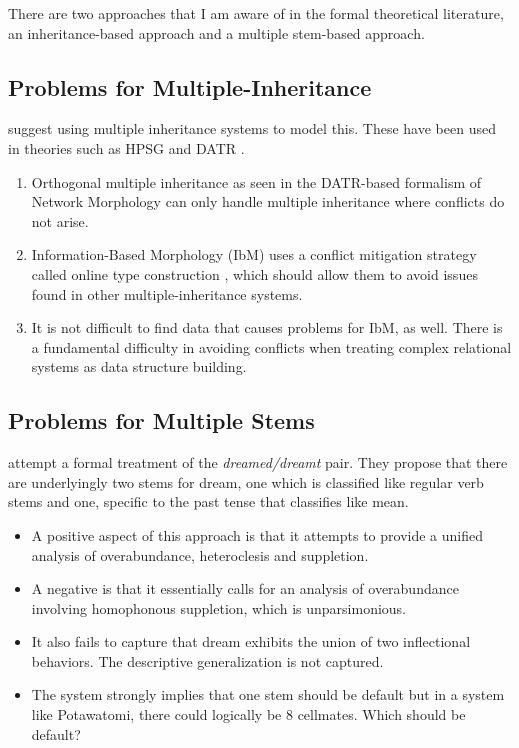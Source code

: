 There are two approaches that I am aware of in the formal theoretical
literature, an inheritance-based approach and a multiple stem-based
approach.

\subsection{Problems for Multiple-Inheritance}

\citep{naranjo2016overabundance} suggest using multiple
inheritance systems to model this. These have been used in theories
such as HPSG \citep{flickinger1985structure, flickinger1987lexical,
  sag1987information} and DATR \citep{evans1996datr}.

\begin{enumerate}
\item Orthogonal multiple inheritance as seen in the DATR-based
  formalism of Network Morphology \citep{brown2012network} can only
  handle multiple inheritance where conflicts do not arise.
\item Information-Based Morphology (IbM)
  \citep{crysmann2012establishing, crysmann2016variable} uses a
  conflict mitigation strategy called online type construction
  \citep{koenig1994type}, which should allow them to avoid issues
  found in other multiple-inheritance systems.
\item It is not difficult to find data that causes problems for IbM,
  as well. There is a fundamental difficulty in avoiding conflicts
  when treating complex relational systems as data structure building.
\end{enumerate}

\subsection{Problems for Multiple Stems}

\citet{stump2016inflectional, bonami2016paradigm} attempt a formal
treatment of the {\it dreamed/dreamt} pair. They propose that there
are underlyingly two stems for {\sc dream}, one which is classified
like regular verb stems and one, specific to the past tense that
classifies like {\sc mean}.
  
\begin{itemize}
\item A positive aspect of this approach is that it attempts to
  provide a unified analysis of overabundance, heteroclesis and
  suppletion.
\item A negative is that it essentially calls for an analysis of
  overabundance involving homophonous suppletion, which is
  unparsimonious.
\item It also fails to capture that {\sc dream} exhibits the union of
  two inflectional behaviors. The descriptive generalization is not
  captured.
\item The system strongly implies that one stem should be default
  but in a system like Potawatomi, there could logically be 8
  cellmates. Which should be default?
\end{itemize}

